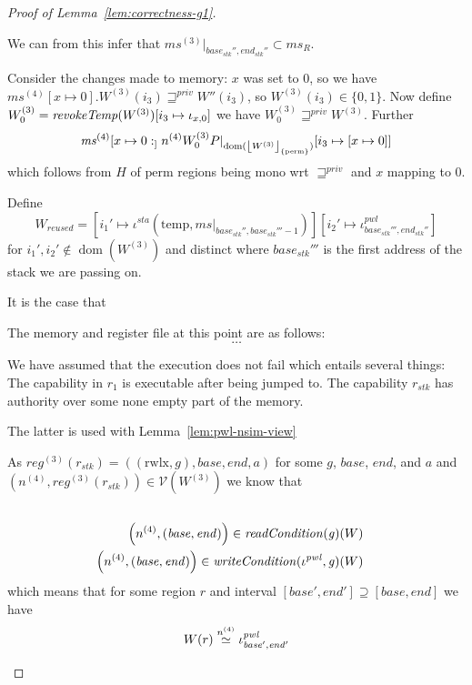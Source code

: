 \documentclass[a4paper]{article}
\DeclarePairedDelimiter\floor{\lfloor}{\rfloor}
\renewcommand{\nsim}[1][n]{\stackrel{\tiny{#1}}{\simeq}}
\DeclareMathOperator{\dom}{dom}
\newcommand{\var}[1]{\mathit{#1}}
\newcommand{\hs}{\var{ms}}
\newcommand{\ms}{\hs}
\newcommand{\gl}{\var{g}}
\newcommand{\addr}{\var{a}}
\newcommand{\start}{\var{base}}
\newcommand{\addrend}{\var{end}}
\newcommand{\reg}{\var{reg}}
\newcommand{\heap}{\var{mem}}
\newcommand{\stk}{\var{stk}}
\newcommand{\pwl}{\var{pwl}}
\newcommand{\sta}{\var{sta}}
\newcommand{\plainfun}[2]{
  \ifthenelse{\equal{#2}{}}
  {\mathit{#1}}
  {\mathit{#1}(#2)}
}
\newcommand{\readCond}[1]{\plainfun{readCondition}{#1}}
\newcommand{\writeCond}[1]{\plainfun{writeCondition}{#1}}
\newcommand{\revokeTemp}[1]{\plainfun{revokeTemp}{#1}}
\newcommand{\erase}[2]{\floor*{#1}_{\{#2\}}}
\newcommand{\futurestr}{\mathbin{\sqsupseteq}^{\var{priv}}}
\newcommand{\heapSat}[3][\heap]{#1 :_{#2} #3}
\newcommand{\memSat}[3][n]{\heapSat[#2]{#1}{#3}}
\newcommand{\asmType}{\plaindom{AsmType}}
\newcommand{\plaindom}[1]{\mathrm{#1}}
\newcommand{\intr}[2]{\mathcal{#1}}
\newcommand{\valueintr}[1]{\intr{V}{#1}}
\newcommand{\stdvr}{\valueintr{\asmType}}
\newcommand{\npair}[2][n]{\left(#1,#2 \right)}
\newcommand{\plainperm}[1]{\mathrm{#1}}
\newcommand{\rwlx}{\plainperm{rwlx}}
\newcommand{\plainview}[1]{\mathrm{#1}}
\newcommand{\perma}{\plainview{perm}}
\newcommand{\temp}{\plainview{temp}}
\begin{document}
\begin{proof}[Proof of Lemma~\ref{lem:correctness-g1}]
\begin{enumproof}
\begin{enumproof}
\begin{enumproof}
\begin{enumproof}
          We can from this infer that $\ms^{(3)} |_{\start_\stk'',\addrend_\stk''} \subset \ms_R$.

          Consider the changes made to memory: $x$ was set to 0, so we have $\ms^{(4)}[x \mapsto 0]$.$W^{(3)}(i_3) \futurestr W''(i_3)$, so $W^{(3)}(i_3) \in \{0,1\}$. Now define $W^{(3)}_0 = \revokeTemp{W^{(3)}}[i_3 \mapsto \iota_{x,0}]$ we have $W^{(3)}_0 \futurestr W^{(3)}$. Further
          \[
            \memSat[n^{(4)}]{\ms^{(4)}[x \mapsto 0]}{W^{(3)}_0}{P|_{\dom(\erase{W^{(3)}}{\perma})}[i_3 \mapsto [x \mapsto 0]]}
          \]
          which follows from $H$ of $\perma$ regions being mono wrt $\futurestr$ and $x$ mapping to 0.

          Define 
          \[
            W_{\var{reused}} = [i_1' \mapsto \iota^\sta (\temp,\ms|_{\start_\stk'',\start_\stk'''-1})][i_2' \mapsto \iota^\pwl_{\start_\stk''',\addrend_\stk''}]
          \]
          for $i_1',i_2' \not\in \dom(W^{(3)})$ and distinct where $\start_\stk'''$ is the first address of the stack we are passing on.
          
          It is the case that 




          The memory and register file at this point are as follows: %
          \[
            \dots  
          \]

          We have assumed that the execution does not fail which entails several things: The capability in $r_1$ is executable after being jumped to. The capability $r_\stk$ has authority over some none empty part of the memory.

          The latter is used with Lemma~\ref{lem:pwl-nsim-view} 

          As $\reg^{(3)}(r_\stk) = ((\rwlx,\gl),\start,\addrend,\addr)$ for some $\gl$, $\start$, $\addrend$, and $\addr$ and $\npair[n^{(4)}]{\reg^{(3)}(r_\stk)} \in \stdvr(W^{(3)})$ we know that
          \begin{align*}
            \\ \npair[n^{(4)}]{(\start,\addrend)} \in \readCond{}(\gl)(W) &
            \\ \npair[n^{(4)}]{(\start,\addrend)} \in \writeCond{}(\iota^\pwl,\gl)(W)
          \end{align*}
          which means that for some region $r$ and interval $[\start',\addrend'] \supseteq [\start,\addrend]$ we have 
          \[
            W(r) \nsim[n^{(4)}] \iota^\pwl_{\start',\addrend'}
          \]
          
        \end{enumproof}
      \end{enumproof}
    \end{enumproof}
  \end{enumproof}
\end{proof}
\end{document}
